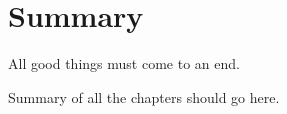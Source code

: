 \chapter{Summary}
\markboth{}{}
\thispagestyle{noheadrule}
\label{ch:summary}

\pgfmathsetmacro\chapclr{\colourarray[7]}
\hypersetup{
citecolor  = \chapclr,
linkcolor  = \chapclr,
urlcolor   = \chapclr,
}

\epigraph{
  All good things must come to an end.
}{

}

Summary of all the chapters should go here.
